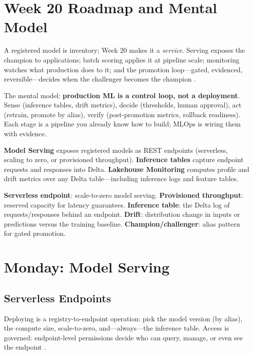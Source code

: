 \section{Week 20 Roadmap and Mental Model}
A registered model is inventory; Week 20 makes it a \emph{service}. Serving exposes the champion to applications; batch scoring applies it at pipeline scale; monitoring watches what production does to it; and the promotion loop---gated, evidenced, reversible---decides when the challenger becomes the champion \cite{databricksModelServing,databricksLakehouseMonitoring}.

The mental model: \textbf{production ML is a control loop, not a deployment}. Sense (inference tables, drift metrics), decide (thresholds, human approval), act (retrain, promote by alias), verify (post-promotion metrics, rollback readiness). Each stage is a pipeline you already know how to build; MLOps is wiring them with evidence.

\begin{definitionbox}
\textbf{Model Serving} exposes registered models as REST endpoints (serverless, scaling to zero, or provisioned throughput). \textbf{Inference tables} capture endpoint requests and responses into Delta. \textbf{Lakehouse Monitoring} computes profile and drift metrics over any Delta table---including inference logs and feature tables.
\end{definitionbox}

\begin{keyterms}
\textbf{Serverless endpoint}: scale-to-zero model serving. \textbf{Provisioned throughput}: reserved capacity for latency guarantees. \textbf{Inference table}: the Delta log of requests/responses behind an endpoint. \textbf{Drift}: distribution change in inputs or predictions versus the training baseline. \textbf{Champion/challenger}: alias pattern for gated promotion.
\end{keyterms}

\section{Monday: Model Serving}
\subsection{Serverless Endpoints}
Deploying is a registry-to-endpoint operation: pick the model version (by alias), the compute size, scale-to-zero, and---always---the inference table. Access is governed: endpoint-level permissions decide who can query, manage, or even see the endpoint \cite{databricksModelServing}.

